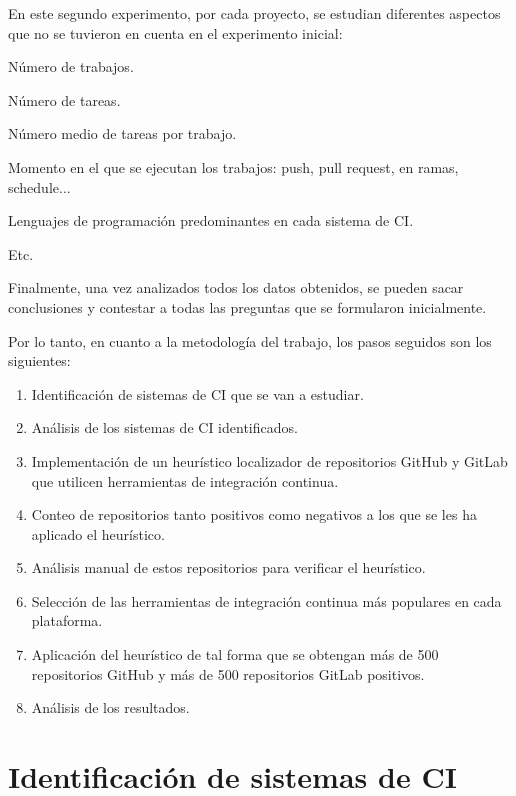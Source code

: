En este segundo experimento, por cada proyecto, se estudian diferentes aspectos que no se tuvieron en cuenta en el experimento inicial:
\begin{compactitem}
    \item Número de trabajos.
    \item Número de tareas.
    \item Número medio de tareas por trabajo.
    \item Momento en el que se ejecutan los trabajos: push, pull request, en ramas, schedule...
    \item Lenguajes de programación predominantes en cada sistema de CI.
    \item Etc.
\end{compactitem}

Finalmente, una vez analizados todos los datos obtenidos, se pueden sacar conclusiones y contestar a todas las preguntas que se formularon inicialmente.
	
Por lo tanto, en cuanto a la metodología del trabajo, los pasos seguidos son los siguientes:
\begin{enumerate}
    \item Identificación de sistemas de CI que se van a estudiar.
    \item Análisis de los sistemas de CI identificados.
    \item Implementación de un heurístico localizador de repositorios GitHub y GitLab que utilicen herramientas de integración continua.
    \item Conteo de repositorios tanto positivos como negativos a los que se les ha aplicado el heurístico.
    \item Análisis manual de estos repositorios para verificar el heurístico.
    \item Selección de las herramientas de integración continua más populares en cada plataforma.
    \item Aplicación del heurístico de tal forma que se obtengan más de 500 repositorios GitHub y más de 500 repositorios GitLab positivos.
    \item Análisis de los resultados.
\end{enumerate}

\section{Identificación de sistemas de CI}

